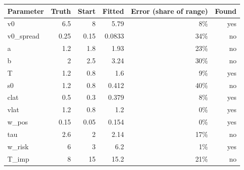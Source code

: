 \begin{tabular}{|l|r|r|r|r|r|}
\hline
\textbf{Parameter} & \textbf{Truth} & \textbf{Start} & \textbf{Fitted} & \textbf{Error (share of range)} & \textbf{Found} \\
\hline
v0 & 6.5 & 8 & 5.79 & 8\% & yes \\
v0\_spread & 0.25 & 0.15 & 0.0833 & 34\% & no \\
a & 1.2 & 1.8 & 1.93 & 23\% & no \\
b & 2 & 2.5 & 3.24 & 30\% & no \\
T & 1.2 & 0.8 & 1.6 & 9\% & yes \\
s0 & 1.2 & 0.8 & 0.412 & 40\% & no \\
clat & 0.5 & 0.3 & 0.379 & 8\% & yes \\
vlat & 1.2 & 0.8 & 1.2 & 0\% & yes \\
w\_pos & 0.15 & 0.05 & 0.154 & 0\% & yes \\
tau & 2.6 & 2 & 2.14 & 17\% & no \\
w\_risk & 6 & 3 & 6.2 & 1\% & yes \\
T\_imp & 8 & 15 & 15.2 & 21\% & no \\
\hline
\end{tabular}
